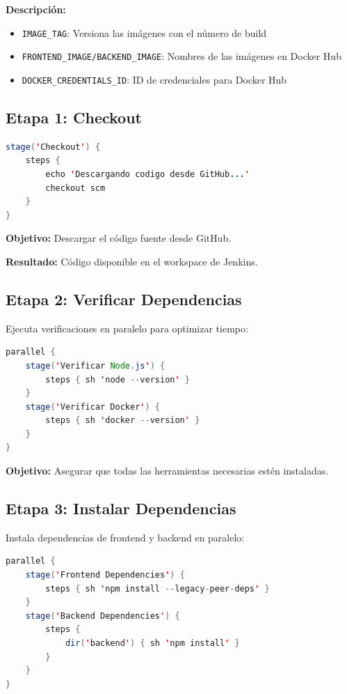 \documentclass[12pt,a4paper]{article}
\begin{document}
\textbf{Descripción:}
\begin{itemize}
    \item \texttt{IMAGE\_TAG}: Versiona las imágenes con el número de build
    \item \texttt{FRONTEND\_IMAGE/BACKEND\_IMAGE}: Nombres de las imágenes en Docker Hub
    \item \texttt{DOCKER\_CREDENTIALS\_ID}: ID de credenciales para Docker Hub
\end{itemize}

\subsection{Etapa 1: Checkout}

\begin{lstlisting}[language=Java]
stage('Checkout') {
    steps {
        echo 'Descargando codigo desde GitHub...'
        checkout scm
    }
}
\end{lstlisting}

\textbf{Objetivo:} Descargar el código fuente desde GitHub.

\textbf{Resultado:} Código disponible en el workspace de Jenkins.

\subsection{Etapa 2: Verificar Dependencias}

Ejecuta verificaciones en paralelo para optimizar tiempo:

\begin{lstlisting}[language=Java]
parallel {
    stage('Verificar Node.js') {
        steps { sh 'node --version' }
    }
    stage('Verificar Docker') {
        steps { sh 'docker --version' }
    }
}
\end{lstlisting}

\textbf{Objetivo:} Asegurar que todas las herramientas necesarias estén instaladas.

\subsection{Etapa 3: Instalar Dependencias}

Instala dependencias de frontend y backend en paralelo:

\begin{lstlisting}[language=Java]
parallel {
    stage('Frontend Dependencies') {
        steps { sh 'npm install --legacy-peer-deps' }
    }
    stage('Backend Dependencies') {
        steps {
            dir('backend') { sh 'npm install' }
        }
    }
}
\end{lstlisting}
\end{document}
